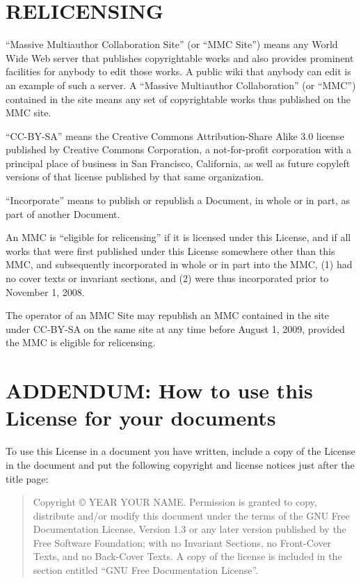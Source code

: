 \section{RELICENSING}

``Massive Multiauthor Collaboration Site'' (or ``MMC Site'') means any
World Wide Web server that publishes copyrightable works and also
provides prominent facilities for anybody to edit those works.  A
public wiki that anybody can edit is an example of such a server.  A
``Massive Multiauthor Collaboration'' (or ``MMC'') contained in the
site means any set of copyrightable works thus published on the MMC
site.

``CC-BY-SA'' means the Creative Commons Attribution-Share Alike 3.0
license published by Creative Commons Corporation, a not-for-profit
corporation with a principal place of business in San Francisco,
California, as well as future copyleft versions of that license
published by that same organization.

``Incorporate'' means to publish or republish a Document, in whole or
in part, as part of another Document.

An MMC is ``eligible for relicensing'' if it is licensed under this
License, and if all works that were first published under this License
somewhere other than this MMC, and subsequently incorporated in whole
or in part into the MMC, (1) had no cover texts or invariant sections,
and (2) were thus incorporated prior to November 1, 2008.

The operator of an MMC Site may republish an MMC contained in the site
under CC-BY-SA on the same site at any time before August 1, 2009,
provided the MMC is eligible for relicensing.


\section*{ADDENDUM: How to use this License for your documents}

To use this License in a document you have written, include a copy of
the License in the document and put the following copyright and
license notices just after the title page:

\bigskip
\begin{quote}
    Copyright \copyright{}  YEAR  YOUR NAME.
    Permission is granted to copy, distribute and/or modify this document
    under the terms of the GNU Free Documentation License, Version 1.3
    or any later version published by the Free Software Foundation;
    with no Invariant Sections, no Front-Cover Texts, and no Back-Cover Texts.
    A copy of the license is included in the section entitled ``GNU
    Free Documentation License''.
\end{quote}
\bigskip

